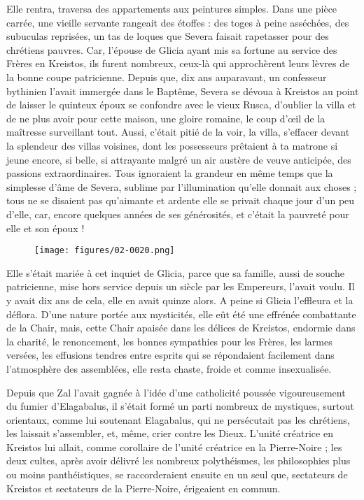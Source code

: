 \documentclass[a4paper, 11pt, oneside, polutonikogreek, french]{article}
\begin{document}
Elle rentra, traversa des appartements aux peintures simples. Dans une pièce carrée, une vieille servante rangeait des étoffes : des toges à peine asséchées, des subuculas reprisées, un tas de loques que Severa faisait rapetasser pour des chrétiens pauvres. Car, l'épouse de Glicia ayant mis sa fortune au service des Frères en Kreistos, ils furent nombreux, ceux-là qui approchèrent leurs lèvres de la bonne coupe patricienne. Depuis que, dix ans auparavant, un confesseur bythinien l'avait immergée dans le Baptême, Severa se dévoua à Kreistos au point de laisser le quinteux époux se confondre avec le vieux Rusca, d'oublier la villa et de ne plus avoir pour cette maison, une gloire romaine, le coup d'œil de la maîtresse surveillant tout. Aussi, c'était pitié de la voir, la villa, s'effacer devant la splendeur des villas voisines, dont les possesseurs prêtaient à ta matrone si jeune encore, si belle, si attrayante malgré un air austère de veuve anticipée, des passions extraordinaires. Tous ignoraient la grandeur en même temps que la simplesse d'âme de Severa, sublime par l'illumination qu'elle donnait aux choses ; tous ne se disaient pas qu'aimante et ardente elle se privait chaque jour d'un peu d'elle, car, encore quelques années de ses générosités, et c'était la pauvreté pour elle et son époux !
\begin{figure}[H]
\centering
\texttt{[image: figures/02-0020.png]}
\end{figure}
Elle s'était mariée à cet inquiet de Glicia, parce que sa famille, aussi de souche patricienne, mise hors service depuis un siècle par les Empereurs, l'avait voulu. Il y avait dix ans de cela, elle en avait quinze alors. A peine si Glicia l'effleura et la déflora. D'une nature portée aux mysticités, elle eût été une effrénée combattante de la Chair, mais, cette Chair apaisée dans les délices de Kreistos, endormie dans la charité, le renoncement, les bonnes sympathies pour les Frères, les larmes versées, les effusions tendres entre esprits qui se répondaient facilement dans l'atmosphère des assemblées, elle resta chaste, froide et comme insexualisée.

Depuis que Zal l'avait gagnée à l'idée d'une catholicité poussée vigoureusement du fumier d'Elagabalus, il s'était formé un parti nombreux de mystiques, surtout orientaux, comme lui soutenant Elagabalus, qui ne persécutait pas les chrétiens, les laissait s'assembler, et, même, crier contre les Dieux. L'unité créatrice en Kreistos lui allait, comme corollaire de l'unité créatrice en la Pierre-Noire ; les deux cultes, après avoir délivré les nombreux polythéismes, les philosophies plus ou moins panthéistiques, se raccorderaient ensuite en un seul que, sectateurs de Kreistos et sectateurs de la Pierre-Noire, érigeaient en commun.
\end{document}
